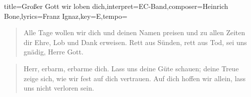 \documentclass{leadsheet}
\begin{document}
\begin{song}{title={Großer Gott wir loben dich},interpret={EC-Band},composer={Heinrich Bone},lyrics={Franz Ignaz},key={E},tempo={}}
\begin{verse}
Alle Tage wollen wir dich und deinen Namen preisen
und zu allen Zeiten dir Ehre, Lob und Dank erweisen.
Rett aus Sünden, rett aus Tod, sei uns gnädig, Herre Gott.
\end{verse}

\begin{verse}
Herr, erbarm, erbarme dich. Lass uns deine Güte schauen;
deine Treue zeige sich, wie wir fest auf dich vertrauen.
Auf dich hoffen wir allein, lass uns nicht verloren sein.
\end{verse}

\end{song}
\end{document}
